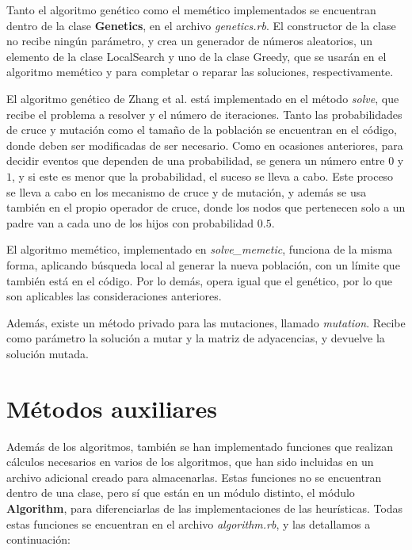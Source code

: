 Tanto el algoritmo genético como el memético implementados se encuentran dentro de
la clase \textbf{Genetics}, en el archivo \textit{genetics.rb}. El constructor
de la clase no recibe ningún parámetro, y crea un generador de números aleatorios,
un elemento de la clase LocalSearch y uno de la clase Greedy, que se usarán en el
algoritmo memético y para completar o reparar las soluciones, respectivamente.

El algoritmo genético de Zhang et al. está implementado en el método \textit{solve},
que recibe el problema a resolver y el número de iteraciones. Tanto las probabilidades
de cruce y mutación como el tamaño de la población se encuentran en el código, donde
deben ser modificadas de ser necesario. Como en ocasiones anteriores, para decidir
eventos que dependen de una probabilidad, se genera un número entre $0$ y $1$, y si
este es menor que la probabilidad, el suceso se lleva a cabo. Este proceso se lleva
a cabo en los mecanismo de cruce y de mutación, y además se usa también en el propio
operador de cruce, donde los nodos que pertenecen solo a un padre van a cada uno de
los hijos con probabilidad $0.5$.

El algoritmo memético, implementado en \textit{solve_memetic}, funciona de la misma
forma, aplicando búsqueda local al generar la nueva población, con un límite que
también está en el código. Por lo demás, opera  igual que el genético, por lo que
son aplicables las consideraciones anteriores.

Además, existe un método privado para las mutaciones, llamado \textit{mutation}.
Recibe como parámetro la solución a mutar y la matriz de adyacencias, y devuelve
la solución mutada.


\section{Métodos auxiliares}

Además de los algoritmos, también se han implementado funciones que realizan
cálculos necesarios en varios de los algoritmos, que han sido incluidas en un
archivo adicional creado para almacenarlas. Estas funciones no se encuentran
dentro de una clase, pero sí que están en un módulo distinto, el módulo \textbf{Algorithm},
para diferenciarlas de las implementaciones de las heurísticas. Todas estas funciones
se encuentran en el archivo \textit{algorithm.rb}, y las detallamos a continuación:

